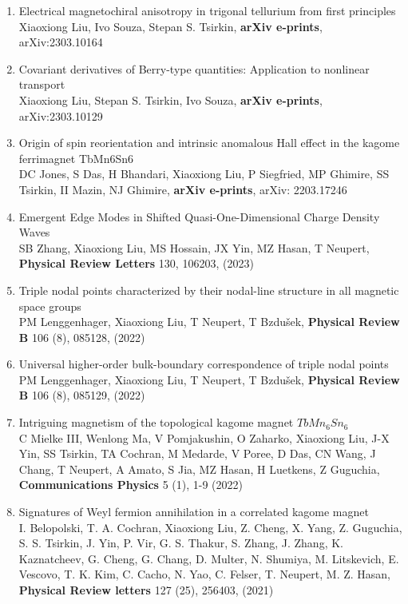 \documentclass[12pt,a4paper,sans]{moderncv} %
\begin{document}
{{\begin{enumerate}
\setlength{\itemsep}{5pt}
    \item Electrical magnetochiral anisotropy in trigonal tellurium from first principles\\ \textcolor{cvblue}{Xiaoxiong Liu}, Ivo Souza, Stepan S. Tsirkin, \textbf{arXiv e-prints}, arXiv:2303.10164
  \item Covariant derivatives of Berry-type quantities: Application to nonlinear transport\\ \textcolor{cvblue}{Xiaoxiong Liu}, Stepan S. Tsirkin, Ivo Souza, \textbf{arXiv e-prints}, arXiv:2303.10129
   \item Origin of spin reorientation and intrinsic anomalous Hall effect in the kagome ferrimagnet TbMn6Sn6\\ DC Jones, S Das, H Bhandari, \textcolor{cvblue}{Xiaoxiong Liu}, P Siegfried, MP Ghimire, SS Tsirkin, II Mazin, NJ Ghimire, \textbf{arXiv e-prints}, arXiv: 2203.17246
  \item Emergent Edge Modes in Shifted Quasi-One-Dimensional Charge Density Waves\\ SB Zhang, \textcolor{cvblue}{Xiaoxiong Liu}, MS Hossain, JX Yin, MZ Hasan, T Neupert, \textbf{Physical Review Letters}  130, 106203, (2023)
   \item Triple nodal points characterized by their nodal-line structure in all magnetic space groups\\ PM Lenggenhager, \textcolor{cvblue}{Xiaoxiong Liu}, T Neupert, T Bzdušek,  \textbf{Physical Review B} 106 (8), 085128, (2022)
  \item Universal higher-order bulk-boundary correspondence of triple nodal points\\ PM Lenggenhager, \textcolor{cvblue}{Xiaoxiong Liu}, T Neupert, T Bzdušek, \textbf{Physical Review B} 106 (8), 085129, (2022)
  \item Intriguing magnetism of the topological kagome magnet $TbMn_6Sn_6$\\ C Mielke III, Wenlong Ma, V Pomjakushin, O Zaharko, \textcolor{cvblue}{Xiaoxiong Liu}, J-X Yin, SS Tsirkin, TA Cochran, M Medarde, V Poree, D Das, CN Wang, J Chang, T Neupert, A Amato, S Jia, MZ Hasan, H Luetkens, Z Guguchia, \textbf{Communications Physics} 5 (1), 1-9 (2022)
  \item Signatures of Weyl fermion annihilation in a correlated kagome magnet\\ I. Belopolski, T. A. Cochran, \textcolor{cvblue}{Xiaoxiong Liu}, Z. Cheng, X. Yang, Z. Guguchia, S. S. Tsirkin, J. Yin, P. Vir, G. S. Thakur, S. Zhang, J. Zhang, K. Kaznatcheev, G. Cheng, G. Chang, D. Multer, N. Shumiya, M. Litskevich, E. Vescovo, T. K. Kim, C. Cacho, N. Yao, C. Felser, T. Neupert, M. Z. Hasan, \textbf{Physical Review letters} 127 (25), 256403, (2021)

\end{enumerate}}}
\end{document}
